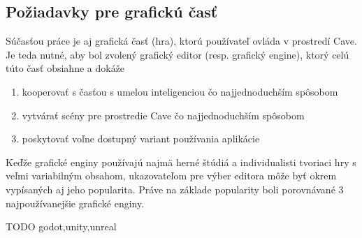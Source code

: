 \subsection{Požiadavky pre grafickú časť}\label{subsec:requirements-game}

Súčasťou práce je aj grafická časť (hra), ktorú používateľ ovláda v prostredí Cave.
Je teda nutné, aby bol zvolený grafický editor (resp. grafický engine), ktorý celú túto časť obsiahne a dokáže
\begin{enumerate}
    \item kooperovať s časťou s umelou inteligenciou čo najjednoduchším spôsobom
    \item vytvárať scény pre prostredie Cave čo najjednoduchším spôsobom
    \item poskytovať voľne dostupný variant používania aplikácie
\end{enumerate}
Keďže grafické enginy používajú najmä herné štúdiá a individualisti tvoriaci hry s veľmi variabilným obsahom,
ukazovateľom pre výber editora môže byť okrem vypísaných aj jeho popularita.
Práve na základe popularity\cite{best_3d_game_engines} boli porovnávané 3 najpoužívanejšie grafické enginy.

TODO
godot,unity,unreal
